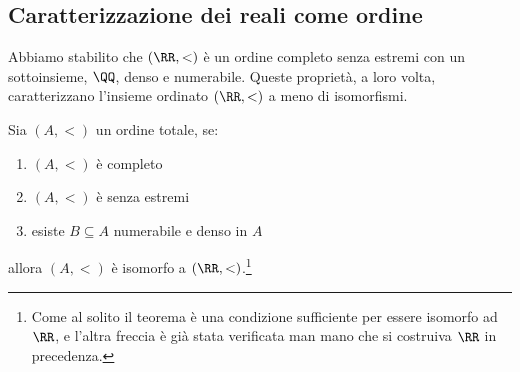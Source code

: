 \documentclass[11pt]{scrartcl}
\begin{document}
\subsection{Caratterizzazione dei reali come ordine}
Abbiamo stabilito che $(\RR,<)$ è un ordine completo senza estremi con un sottoinsieme, $\QQ$, denso e numerabile.
Queste proprietà, a loro volta, caratterizzano l'insieme ordinato $(\RR,<)$ a meno di isomorfismi.

\begin{proposition}[Caratterizzazione di $(\RR,<)$]
	Sia $(A,<)$ un ordine totale, se:
	\begin{enumerate}[1.]
		\item $(A,<)$ è completo
		\item $(A,<)$ è senza estremi
		\item esiste $B \subseteq A$ numerabile e denso in $A$
	\end{enumerate} 
	allora $(A,<)$ è isomorfo a $(\RR,<)$.\footnote{Come al solito il teorema è una
	condizione sufficiente per essere isomorfo ad $\RR$, e l'altra freccia è già stata verificata man mano che si costruiva $\RR$ in precedenza.}
\end{proposition}
\end{document}
